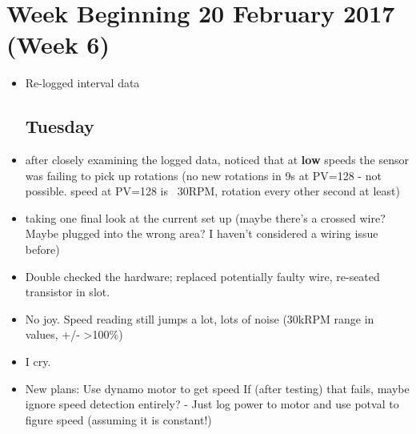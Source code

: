 \documentclass[a4]{report}
\begin{document}
	\section{Week Beginning 20 February 2017 (Week 6)}
	\begin{itemize}
		\subsection*{Monday}
		\item Re-logged interval data
		\subsection*{Tuesday}
		\item after closely examining the logged data, noticed that at \textbf{low} speeds the sensor was failing to pick up rotations (no new rotations in 9s at PV=128 - not possible. speed at PV=128 is ~30RPM, rotation every other second at least)
		\item taking one final look at the current set up (maybe there's a crossed wire? Maybe plugged into the wrong area? I haven't considered a wiring issue before)
		\item Double checked the hardware; replaced potentially faulty wire, re-seated transistor in slot.
		\item No joy. Speed reading still jumps a lot, lots of noise (30kRPM range in values, +/- >100\%)
		\item I cry.
		\item New plans:
		\subitem Use dynamo motor to get speed
		\subitem If (after testing) that fails, maybe ignore speed detection entirely? - Just log power to motor and use potval to figure speed (assuming it is constant!)

\end{itemize}
\end{document}
